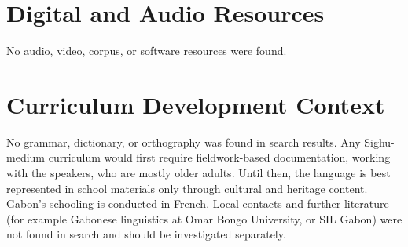 \documentclass[12pt]{article}
\begin{document}
\section{Digital and Audio Resources}
No audio, video, corpus, or software resources were found.

\section{Curriculum Development Context}
No grammar, dictionary, or orthography was found in search results. Any Sighu-medium curriculum would first require fieldwork-based documentation, working with the speakers, who are mostly older adults. Until then, the language is best represented in school materials only through cultural and heritage content. Gabon's schooling is conducted in French. Local contacts and further literature (for example Gabonese linguistics at Omar Bongo University, or SIL Gabon) were not found in search and should be investigated separately.
\end{document}
